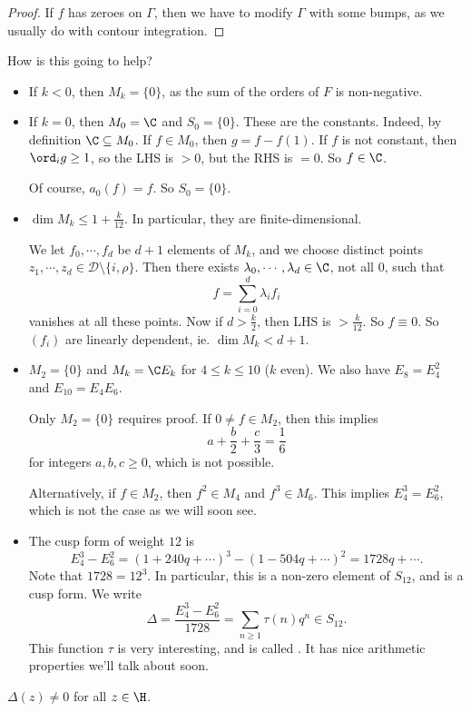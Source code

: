 \documentclass[a4paper]{article}
\begin{document}
\begin{proof}
  If $f$ has zeroes on $\Gamma$, then we have to modify $\Gamma$ with some bumps, as we usually do with contour integration.
\end{proof}

How is this going to help?
\begin{itemize}
  \item If $k < 0$, then $M_k = \{0\}$, as the sum of the orders of $F$ is non-negative.
  \item If $k = 0$, then $M_0 = \C$ and $S_0 = \{0\}$. These are the constants. Indeed, by definition $\C \subseteq M_0$. If $f \in M_0$, then $g = f - f(1)$. If $f$ is not constant, then $\ord_i g \geq 1$, so the LHS is $>0$, but the RHS is $=0$. So $f \in \C$.

    Of course, $a_0(f) = f$. So $S_0 = \{0\}$.
  \item $\dim M_k \leq 1 + \frac{k}{12}$. In particular, they are finite-dimensional.

    We let $f_0, \cdots, f_d$ be $d + 1$ elements of $M_k$, and we choose distinct points $z_1, \cdots, z_d \in \mathcal{D} \setminus \{i, \rho\}$. Then there exists $\lambda_0, \cdots, \lambda_d \in \C$, not all $0$, such that
    \[
      f = \sum_{i = 0}^d \lambda_i f_i
    \]
    vanishes at all these points. Now if $d > \frac{k}{2}$, then LHS is $> \frac{k}{12}$. So $f \equiv 0$. So $(f_i)$ are linearly dependent, ie. $\dim M_k < d + 1$.
  \item $M_2 = \{0\}$ and $M_k = \C E_k$ for $4 \leq k \leq 10$ ($k$ even). We also have $E_8 = E_4^2$ and $E_{10} = E_4 E_6$.

    Only $M_2 = \{0\}$ requires proof. If $0 \not= f \in M_2$, then this implies
    \[
      a + \frac{b}{2} + \frac{c}{3} = \frac{1}{6}
    \]
    for integers $a, b, c \geq 0$, which is not possible.

    Alternatively, if $f \in M_2$, then $f^2 \in M_4$ and $f^3 \in M_6$. This implies $E_4^3 = E_6^2$, which is not the case as we will soon see.
  \item The cusp form of weight $12$ is
    \[
      E_4^3 - E_6^2 = (1 + 240 q + \cdots)^3 - (1 - 504 q + \cdots)^2 = 1728q + \cdots.
    \]
    Note that $1728 = 12^3$. In particular, this is a non-zero element of $S_{12}$, and is a cusp form. We write
    \[
      \Delta = \frac{E_4^3 - E_6^2}{1728} = \sum_{n \geq 1} \tau(n) q^n \in S_{12}.
    \]\index{$\Delta$}
    This function $\tau$ is very interesting, and is called . It has nice arithmetic properties we'll talk about soon.
\end{itemize}
\begin{prop}
  $\Delta(z) \not= 0$ for all $z \in \H$.
\end{prop}
\end{document}
